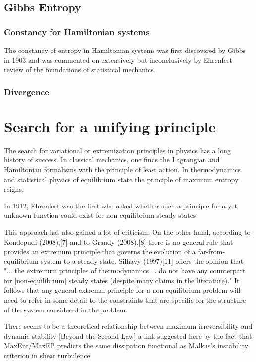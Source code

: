 \documentclass[a4paper,12pt,nofootinbib]{article}
\begin{document}
\subsection{Gibbs Entropy}

\subsubsection{Constancy for Hamiltonian systems}

The constancy of entropy in Hamiltonian systems was first discovered by Gibbs in 1903 and was commented on extensively but inconclusively by Ehrenfest review of the foundations of statistical mechanics.

\subsubsection{Divergence}




\section{Search for a unifying principle}

The search for variational or extremization principles in physics has a long history of success. In classical mechanics, one finds the Lagrangian and Hamiltonian formalisms with the principle of least action. In thermodynamics and statistical physics of equilibrium state the principle of maximum entropy reigns. 

In 1912, Ehrenfest was the first who asked whether such a principle for a yet unknown function could exist for non-equilibrium steady states. 

This approach has also gained a lot of criticism.
On the other hand, according to Kondepudi (2008),[7] and to Grandy (2008),[8] there is no general rule that provides an extremum principle that governs the evolution of a far-from-equilibrium system to a steady state. 
Silhavy (1997)[11] offers the opinion that "... the extremum principles of thermodynamics ... do not have any counterpart for [non-equilibrium] steady states (despite many claims in the literature)." It follows that any general extremal principle for a non-equilibrium problem will need to refer in some detail to the constraints that are specific for the structure of the system considered in the problem.

There seems to be a theoretical relationship between maximum irreversibility and dynamic stability [Beyond the Second Law] a link suggested here by the fact that MaxEnt/MaxEP predicts the same dissipation functional as Malkus's instability criterion in shear turbulence
\end{document}
